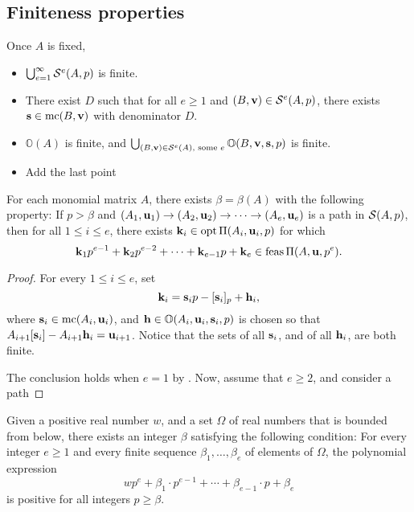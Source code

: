 \documentclass[11pt]{amsart}
\begin{document}
\subsection*{Finiteness properties}

Once $A$ is fixed,
\begin{itemize}
 \item $\bigcup_{e=1}^\infty \mathcal{S}^e(A,p)$ is finite.
 \item There exist $D$ such that for all $e \geq 1$ and $(B, \mathbf{v}) \in \mathcal{S}^e(A,p)$, there exists $\mathbf{s} \in \operatorname{mc}(B, \mathbf{v})$ with denominator $D$. 
 \item $\mathbb{O}(A)$ is finite, and $\bigcup_{(B, \mathbf{v}) \in \mathcal{S}^e(A), \text{ some } e} \mathbb{O}(B, \mathbf{v}, \mathbf{s}, p)$ is finite.
 \item Add the last point
\end{itemize}


\begin{theorem}
   For each monomial matrix $A$, there exists $\beta = \beta(A)$ with the following property\textup:
   If $p>\beta$ and $(A_1, \mathbf{u}_1) \to (A_2, \mathbf{u}_2) \to \cdots \to (A_e, \mathbf{u}_e)$ is a path in $\mathcal{S}(A,p)$, then for all $1 \leq i \leq e$, there exists $\mathbf{k}_i \in \operatorname{opt} \Pi(A_i, \mathbf{u}_i,p)$  for which 
 \[
  \mathbf{k}_1 p^{e-1} + \mathbf{k}_2 p^{e-2} + \cdots + \mathbf{k}_{e-1} p + \mathbf{k}_e \in \operatorname{feas} \Pi(A, \mathbf{u}, p^e).
 \]
\end{theorem}

\begin{proof}
For every $1 \leq i \leq e$, set 
 \[
\mathbf{k}_i = \mathbf{s}_i p - [\mathbf{s}_i]_p + \mathbf{h}_i,
\]
where $\mathbf{s}_i \in \operatorname{mc}(A_i, \mathbf{u}_i)$, and $\mathbf{h} \in \mathbb{O}(A_i, \mathbf{u}_i, \mathbf{s}_i, p)$ is chosen so that $A_{i+1} [\mathbf{s}_i] - A_{i+1} \mathbf{h}_i = \mathbf{u}_{i+1}$.
Notice that the sets of all $\mathbf{s}_i$, and of all $\mathbf{h}_i$, are both finite. 

The conclusion holds when $e=1$ by . 
Now, assume that $e \geq 2$, and consider a path 
\end{proof}


\begin{lemma}
   \label{positive polynomial: L}
   Given a positive real number $w$, and a set $\Omega$ of real numbers that is bounded from below, there exists an integer $\beta$ satisfying the following condition\textup:
   For every integer $e \geq 1$ and every finite sequence $\beta_1, \ldots, \beta_e$ of elements of $\Omega$, the polynomial expression \[ wp^{e} + \beta_1 \cdot p^{e-1} + \cdots + \beta_{e-1} \cdot p + \beta_e  \] is positive for all integers $p \geq \beta$.
\end{lemma}
\end{document}
